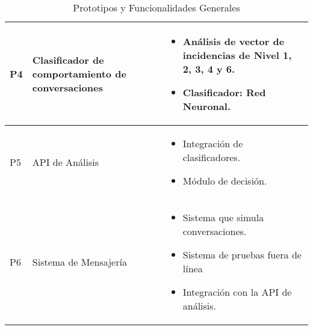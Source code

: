 \begin{table}[h]
\begin{center}
\begin{tabular}{|l|p{45mm}|p{80mm}|}
P4 & Clasificador de comportamiento de conversaciones & \begin{itemize}
\item An\'alisis de vector de incidencias de Nivel 1, 2, 3, 4 y 6.
\item Clasificador: Red Neuronal.
\end{itemize} \\

\hline 

P5 & API de An\'alisis & \begin{itemize}
\item Integraci\'on de clasificadores.
\item M\'odulo de decisi\'on.
\end{itemize} \\

\hline 

P6 & Sistema de Mensajer\'ia & \begin{itemize}
\item Sistema que simula conversaciones.
\item Sistema de pruebas fuera de l\'inea
\item Integraci\'on con la API de an\'alisis. 
\end{itemize} \\

\hline 


\end{tabular}
\caption{Prototipos y Funcionalidades Generales}
\label{tablaprototipos}

\end{center}

\end{table}
